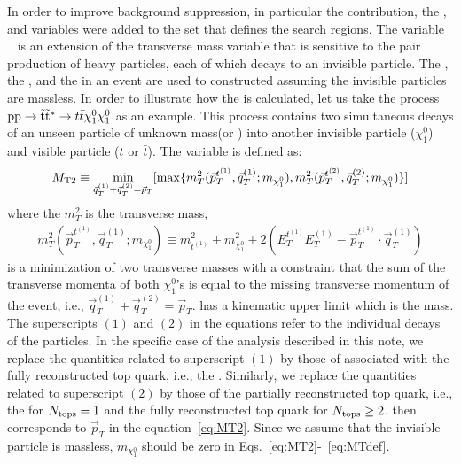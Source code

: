 In order to improve background suppression, in particular the \ttbar
contribution, the \MET, \HT and \MTTwo variables were added to the 
set that defines the search regions. The variable 
\MTTwo~\cite{Lester:1999tx,Barr:2003rg} is an extension of the transverse 
mass variable that is sensitive to the pair production of heavy particles, each
of which decays to an invisible particle.
The \pTop, the \pRsystem, and the \MET in an event
are used to constructed \MTTwo assuming the invisible particles are massless.
In order to illustrate how the \MTTwo is calculated, let us take the process 
${\rm pp} \rightarrow \tilde{{\mathrm t}}\tilde{{\mathrm t}}^\ast\rightarrow t\bar{t}\chi_1^0\chi_1^0$
as an example. This process contains two simultaneous decays of an unseen 
particle of unknown mass(\sTop or \santiTop) into another invisible 
particle ($\chi_1^0$) and visible particle ($t$ or $\bar{t}$). The
variable \MTTwo is defined as:
\begin{equation} \label{eq:MT2}
   \begin{array}{l}
     \displaystyle{ \MTTwo \equiv \min_{\vec{q}_{T}^{(1)}+\vec{q}_{T}^{(2)} = \vec{p}_{T}} [\max\{m_{T}^2(\vec{p}_{T}^{t^{(1)}}, \vec{q}_{T}^{(1)}; m_{\chi_1^0}), m_{T}^2(\vec{p}_{T}^{t^{(2)}}, \vec{q}_{T}^{(2)}; m_{\chi_1^0})\}]  } 
   \end{array}
\end{equation}
where the $m_{T}^2$ is the transverse mass,
\begin{equation} \label{eq:MTdef}
   \begin{array}{l}
     \displaystyle{
        m_{T}^2(\vec{p}_{T}^{t^{(1)}}, \vec{q}_{T}^{(1)}; m_{\chi_1^0}) \equiv m_{t^{(1)}}^{2} + m_{\chi_1^0}^2 + 2(E_{T}^{t^{(1)}}E_{T}^{(1)} - \vec{p}_{T}^{t^{(1)}} \cdot \vec{q}_{T}^{(1)})
     }
   \end{array}
\end{equation} 
\MTTwo is a minimization of two transverse masses with a constraint that 
the sum of the transverse momenta of both $\chi_1^0$'s is equal to the 
missing transverse momentum of the event, i.e., 
$\vec{q}_{T}^{(1)}+\vec{q}_{T}^{(2)} = \vec{p}_{T}$. 
\MTTwo has a kinematic upper limit which is the \sTop mass. 
The superscripts $(1)$ and $(2)$ in the equations refer to the individual 
decays of the \sTop particles. In the specific case of the analysis described
in this note, we replace the quantities related to superscript $(1)$ by those
of associated with the fully reconstructed top quark, i.e., the \pTop. 
Similarly, we replace the quantities related to superscript $(2)$ by those
of the partially reconstructed top quark, i.e., the \pRsystem 
for $N_{\text{tops}} =1$ and the fully reconstructed top quark for $N_{\text{tops}} \ge 2$. 
\MET then corresponds to $\vec{p}_{T}$ in the equation~\ref{eq:MT2}. 
Since we assume that the invisible particle is massless, $m_{\chi_1^0}$ should 
be zero in Eqs.~\ref{eq:MT2}-~\ref{eq:MTdef}. 

